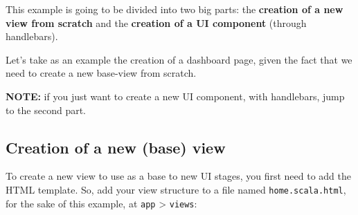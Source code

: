 \documentclass[
  11pt,
]{krantz}
\begin{document}
This example is going to be divided into two big parts: the \textbf{creation of a new view from scratch} and the \textbf{creation of a UI component} (through handlebars).

Let's take as an example the creation of a dashboard page, given the fact that we need to create a new base-view from scratch.

\textbf{NOTE:} if you just want to create a new UI component, with handlebars, jump to the second part.

\hypertarget{creation-of-a-new-base-view}{%
\subsection{Creation of a new (base) view}\label{creation-of-a-new-base-view}}

To create a new view to use as a base to new UI stages, you first need to add the HTML template. So, add your view structure to a file named \texttt{home.scala.html}, for the sake of this example, at \texttt{app} \textgreater{} \texttt{views}:
\end{document}
